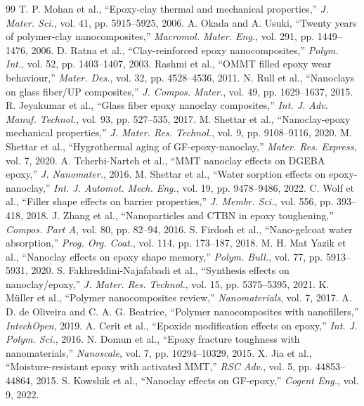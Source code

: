 \documentclass[conference]{IEEEtran}
\begin{document}
\begin{thebibliography}{99}
 T. P. Mohan et al., ``Epoxy-clay thermal and mechanical properties,'' \emph{J. Mater. Sci.}, vol. 41, pp. 5915--5925, 2006.
 A. Okada and A. Usuki, ``Twenty years of polymer-clay nanocomposites,'' \emph{Macromol. Mater. Eng.}, vol. 291, pp. 1449--1476, 2006.
 D. Ratna et al., ``Clay-reinforced epoxy nanocomposites,'' \emph{Polym. Int.}, vol. 52, pp. 1403--1407, 2003.
 Rashmi et al., ``OMMT filled epoxy wear behaviour,'' \emph{Mater. Des.}, vol. 32, pp. 4528--4536, 2011.
 N. Rull et al., ``Nanoclays on glass fiber/UP composites,'' \emph{J. Compos. Mater.}, vol. 49, pp. 1629--1637, 2015.
 R. Jeyakumar et al., ``Glass fiber epoxy nanoclay composites,'' \emph{Int. J. Adv. Manuf. Technol.}, vol. 93, pp. 527--535, 2017.
 M. Shettar et al., ``Nanoclay-epoxy mechanical properties,'' \emph{J. Mater. Res. Technol.}, vol. 9, pp. 9108--9116, 2020.
 M. Shettar et al., ``Hygrothermal aging of GF-epoxy-nanoclay,'' \emph{Mater. Res. Express}, vol. 7, 2020.
 A. Tcherbi-Narteh et al., ``MMT nanoclay effects on DGEBA epoxy,'' \emph{J. Nanomater.}, 2016.
 M. Shettar et al., ``Water sorption effects on epoxy-nanoclay,'' \emph{Int. J. Automot. Mech. Eng.}, vol. 19, pp. 9478--9486, 2022.
 C. Wolf et al., ``Filler shape effects on barrier properties,'' \emph{J. Membr. Sci.}, vol. 556, pp. 393--418, 2018.
 J. Zhang et al., ``Nanoparticles and CTBN in epoxy toughening,'' \emph{Compos. Part A}, vol. 80, pp. 82--94, 2016.
 S. Firdosh et al., ``Nano-gelcoat water absorption,'' \emph{Prog. Org. Coat.}, vol. 114, pp. 173--187, 2018.
 M. H. Mat Yazik et al., ``Nanoclay effects on epoxy shape memory,'' \emph{Polym. Bull.}, vol. 77, pp. 5913--5931, 2020.
 S. Fakhreddini-Najafabadi et al., ``Synthesis effects on nanoclay/epoxy,'' \emph{J. Mater. Res. Technol.}, vol. 15, pp. 5375--5395, 2021.
 K. M\"{u}ller et al., ``Polymer nanocomposites review,'' \emph{Nanomaterials}, vol. 7, 2017.
 A. D. de Oliveira and C. A. G. Beatrice, ``Polymer nanocomposites with nanofillers,'' \emph{IntechOpen}, 2019.
 A. Cerit et al., ``Epoxide modification effects on epoxy,'' \emph{Int. J. Polym. Sci.}, 2016.
 N. Domun et al., ``Epoxy fracture toughness with nanomaterials,'' \emph{Nanoscale}, vol. 7, pp. 10294--10329, 2015.
 X. Jia et al., ``Moisture-resistant epoxy with activated MMT,'' \emph{RSC Adv.}, vol. 5, pp. 44853--44864, 2015.
 S. Kowshik et al., ``Nanoclay effects on GF-epoxy,'' \emph{Cogent Eng.}, vol. 9, 2022.

\end{thebibliography}
\end{document}

